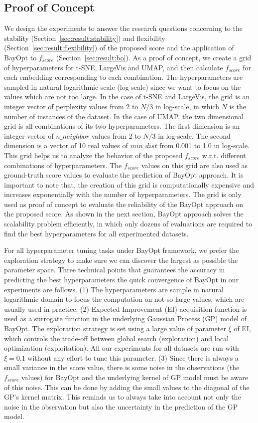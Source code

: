 \subsection{Proof of Concept}
We design the experiments to answer the research questions concerning to the stability (Section~\ref{sec:result:stability}) and flexibility (Section~\ref{sec:result:flexibility}) of the proposed score and the application of BayOpt to $f_{score}$ (Section~\ref{sec:result:bo}).
As a proof of concept, we create a grid of hyperparameters for t-SNE, LargeVis and UMAP, and then calculate $f_{score}$ for each embedding corresponding to each combination.
The hyperparameters are sampled in natural logarithmic scale (log-scale) since we want to focus on the values which are not too large.
In the case of t-SNE and LargeVis, the grid is an integer vector of perplexity values from 2 to $N/3$ in log-scale, in which $N$ is the number of instances of the dataset.
In the case of UMAP, the two dimensional grid is all combinations of its two hyperparameters.
The first dimension is an integer vector of $n\_neighbor$ values from 2 to $N/3$ in log-scale.
The second dimension is a vector of 10 real values of $min\_dist$ from 0.001 to 1.0 in log-scale.
This grid helps us to analyze the behavior of the proposed $f_{score}$ w.r.t. different combinations of hyperparameters.
The $f_{score}$ values on this grid are also used as ground-truth score values to evaluate the prediction of BayOpt approach.
It is important to note that, the creation of this grid is computationally expensive and increases exponentially with the number of hyperparameters.
The grid is only used as proof of concept to evaluate the reliability of the BayOpt approach on the proposed score.
As shown in the next section, BayOpt approach solves the scalability problem efficiently, in which only dozens of evaluations are required to find the best hyperparameters for all experimented datasets.

For all hyperparameter tuning tasks under BayOpt framework, we prefer the exploration strategy to make sure we can discover the largest as possible the parameter space.
Three technical points that guarantees the accuracy in predicting the best hyperparameters the quick convergence of BayOpt in our experiments are follows.
(1) The hyperparameters are sample in natural logarithmic domain to focus the computation on not-so-large values, which are usually used in practice.
(2) Expected Improvement (EI) acquisition function is used as a surrogate function in the underlying Gaussian Process (GP) model of BayOpt.
The exploration strategy is set using a large value of parameter $\xi$ of EI, which controls the trade-off between global search (exploration) and local optimization (exploitation).
All our experiments for all datasets are run with $\xi=0.1$ without any effort to tune this parameter.
(3) Since there is always a small variance in the score value, there is some noise in the observations (the $f_{score}$ values) for BayOpt and the underlying kernel of GP model must be aware of this noise.
This can be done by adding the small values to the diagonal of the GP's kernel matrix.
This reminds us to always take into account not only the noise in the observation but also the uncertainty in the prediction of the GP model.

